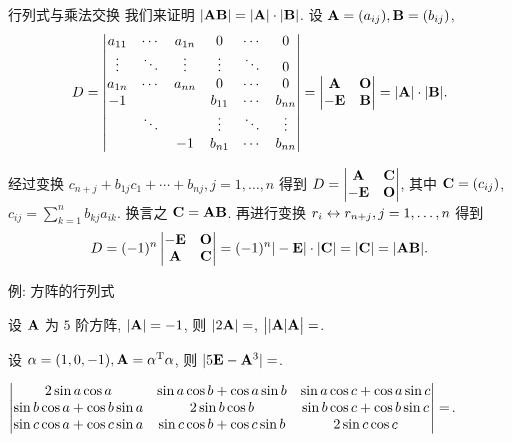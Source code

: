 \begin{frame}{行列式与乘法交换}
	\onslide<+->
	我们来证明 $|{\mathbf{A}}{\mathbf{B}}|=|{\mathbf{A}}|\cdot|{\mathbf{B}}|$.
	\onslide<+->
	设 ${\mathbf{A}}=(a_{ij}),{\mathbf{B}}=(b_{ij})$,
	\[D=\left|\begin{matrix}
		a_{11}&\cdots&a_{1n}&0&\cdots&0\\
		\vdots&\ddots&\vdots&\vdots&\ddots&0\\
		a_{1n}&\cdots&a_{nn}&0&\cdots&0\\
		-1&&&b_{11}&\cdots&b_{nn}\\
		&\ddots&&\vdots&\ddots&\vdots\\
		&&-1&b_{n1}&\cdots&b_{nn}
	\end{matrix}\right|=\left|\begin{matrix}{\mathbf{A}}&{\mathbf{O}}\\-{\mathbf{E}}&{\mathbf{B}}\end{matrix}\right|=|{\mathbf{A}}|\cdot|{\mathbf{B}}|.\]

	\onslide<+->
	经过变换 $c_{n+j}+b_{1j}c_1+\cdots+b_{nj},j=1,\dots,n$ 得到
	$D=\left|\begin{matrix}{\mathbf{A}}&{\mathbf{C}}\\-{\mathbf{E}}&{\mathbf{O}}\end{matrix}\right|$,
	\onslide<+->
	其中 ${\mathbf{C}}=(c_{ij})$, $c_{ij}=\sum_{k=1}^nb_{kj}a_{ik}$.
	\onslide<+->
	换言之 ${\mathbf{C}}={\mathbf{A}}{\mathbf{B}}$.
	\onslide<+->
	再进行变换 $r_i\leftrightarrow r_{n+j},j=1,\dots,n$ 得到
	\[D=(-1)^n\left|\begin{matrix}-{\mathbf{E}}&{\mathbf{O}}\\{\mathbf{A}}&{\mathbf{C}}\end{matrix}\right|=(-1)^n|-{\mathbf{E}}|\cdot|{\mathbf{C}}|=|{\mathbf{C}}|=|{\mathbf{A}}{\mathbf{B}}|.\]
\end{frame}


\begin{frame}{例: 方阵的行列式}
	\onslide<+->
	\begin{exercise}
		设 ${\mathbf{A}}$ 为 $5$ 阶方阵, $|{\mathbf{A}}|=-1$, 则
		$|2{\mathbf{A}}|=$,
		$\bigl||{\mathbf{A}}|{\mathbf{A}}\bigr|=$.
	\end{exercise}
	\onslide<+->
	\begin{exercise}
		设 $\alpha=(1,0,-1),{\mathbf{A}}=\alpha^{\mathrm{T}}\alpha$, 则
		$|5{\mathbf{E}}-{\mathbf{A}}^3|=$\fillblank{\visible<+->{$-75$}}.
	\end{exercise}
	\onslide<+->
	\begin{exercise}
		$\left|\begin{matrix}
			2\sin a\cos a&\sin a\cos b+\cos a\sin b&\sin a\cos c+\cos a\sin c\\
			\sin b\cos a+\cos b\sin a&2\sin b\cos b&\sin b\cos c+\cos b\sin c\\
			\sin c\cos a+\cos c\sin a&\sin c\cos b+\cos c\sin b&2\sin c\cos c
		\end{matrix}\right|=$\fillblank{\visible<+->{$0$}}.
	\end{exercise}
\end{frame}

